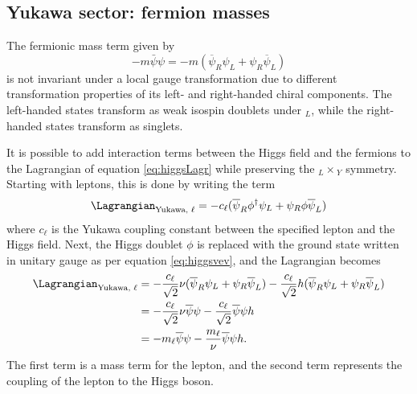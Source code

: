 \subsection{Yukawa sector: fermion masses}

The fermionic mass term given by 
\begin{equation}
    -m\bar{\psi}\psi=-m(\overline{\psi}_R\psi_L+\psi_R\overline{\psi}_L)
\end{equation}
is not invariant under a local gauge transformation due to different transformation properties of its left- and right-handed chiral components. The left-handed states transform as weak isospin doublets under $_L$, while the right-handed states transform as singlets. 

It is possible to add interaction terms between the Higgs field and the fermions to the Lagrangian of equation \ref{eq:higgsLagr} while preserving the $_L\times$$_Y$ symmetry. Starting with leptons, this is done by writing the term
\begin{equation}
    \Lagrangian_{\text{Yukawa, }\ell}=-c_{\ell} (\overline{\psi}_R\phi^{\dagger}\psi_L+\psi_R\phi\overline{\psi}_L)
\end{equation}
where $c_{\ell}$ is the Yukawa coupling constant between the specified lepton and the Higgs field. Next, the Higgs doublet $\phi$ is replaced with the ground state written in unitary gauge as per equation \ref{eq:higgsvev}, and the Lagrangian becomes
\begin{align}
    \Lagrangian_{\text{Yukawa, }\ell} & = -\dfrac{c_{\ell}}{\sqrt{2}}\nu(\overline{\psi}_R\psi_L+\psi_R\overline{\psi}_L) - \dfrac{c_{\ell}}{\sqrt{2}}h(\overline{\psi}_R\psi_L+\psi_R\overline{\psi}_L)\\
             & = -\dfrac{c_{\ell}}{\sqrt{2}}\nu\overline{\psi}\psi - \dfrac{c_{\ell}}{\sqrt{2}}\overline{\psi}\psi h \\
             & = -m_{\ell}\overline{\psi}\psi - \dfrac{m_{\ell}}{\nu}\overline{\psi}\psi h.
\end{align}
The first term is a mass term for the lepton, and the second term represents the coupling of the lepton to the Higgs boson. 

